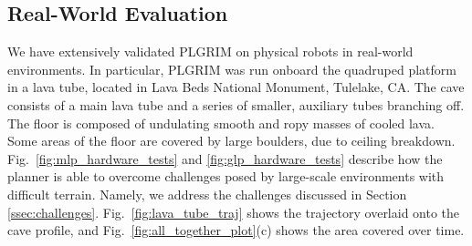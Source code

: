 \documentclass[letterpaper]{article} %
\newcommand{\note}[1]{{\color{red}#1 }}
\begin{document}





\subsection{Real-World Evaluation}
We have extensively validated PLGRIM on physical robots in real-world environments. In particular, PLGRIM was run onboard the quadruped platform in a lava tube, located in Lava Beds National Monument, Tulelake, CA. The cave consists of a main lava tube and a series of smaller, auxiliary tubes branching off. The floor is composed of undulating smooth and ropy masses of cooled lava. Some areas of the floor are covered by large boulders, due to ceiling breakdown. Fig.~\ref{fig:mlp_hardware_tests} and \ref{fig:glp_hardware_tests} describe how the planner is able to overcome challenges posed by large-scale environments with difficult terrain. Namely, we address the challenges discussed in Section \ref{ssec:challenges}. Fig.~\ref{fig:lava_tube_traj} shows the trajectory overlaid onto the cave profile, and Fig.~\ref{fig:all_together_plot}(c) shows the area covered over time.



\end{document}
